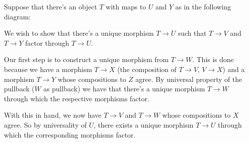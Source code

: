 \documentclass[12pt]{memoir}
\begin{document}
  \begin{ptcbr}
      Suppose that there's an object $T$ with maps to $U$ and $Y$ as in the following diagram:
      \begin{center}
      \end{center}
      We wish to show that there's a unique morphism $T\to U$ such that $T\to V$ and $T\to Y$ factor through $T\to U$.\par 
      Our first step is to construct a unique morphism from $T\to W$. This is done because we have a morphism $T\to X$ (the composition of $T\to V$, $V\to X$) and a morphism $T\to Y$ whose compositions to $Z$ agree. By universal property of the pullback ($W$ as pullback) we have that there's a unique morphism $T\to W$ through which the respective morphisms factor.
      \begin{center}
      \end{center}
      With this in hand, we now have $T\to V$ and $T\to W$ whose compositions to $X$ agree. So by universality of $U$, there exists a unique morphism $T\to U$ through which the corresponding morphisms factor.   
  \end{ptcbr}
\end{document}
